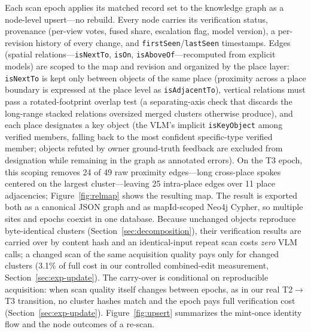 \documentclass[electronics,article,accept,pdftex,moreauthors]{Definitions/mdpi}
\begin{document}
Each scan epoch applies its matched record set to the knowledge graph as a
node-level upsert---no rebuild. Every node carries its verification status,
provenance (per-view votes, fused share, escalation flag, model version), a
per-revision history of every change, and \texttt{firstSeen}/\texttt{lastSeen}
timestamps. Edges (spatial relations---\texttt{isNextTo}, \texttt{isOn},
\texttt{isAboveOf}---recomputed from explicit models) are scoped to the map
and revision and organized by the place layer: \texttt{isNextTo} is kept
only between objects of the same place (proximity across a place boundary
is expressed at the place level as \texttt{isAdjacentTo}), vertical
relations must pass a rotated-footprint overlap test (a separating-axis
check that discards the long-range stacked relations oversized merged
clusters otherwise produce), and each place designates a key object
(the VLM's implicit \texttt{isKeyObject} among verified members, falling
back to the most confident specific-type verified member; objects refuted
by owner ground-truth feedback are excluded from designation while
remaining in the graph as annotated errors). On the T3
epoch, this scoping removes 24 of 49 raw proximity edges---long
cross-place spokes centered on the largest cluster---leaving 25
intra-place edges over 11 place adjacencies; Figure~\ref{fig:relmap} shows
the resulting map. The result is exported both as a canonical
JSON graph and as mapId-scoped Neo4j Cypher, so multiple sites and epochs
coexist in one database. Because unchanged objects reproduce byte-identical
clusters (Section~\ref{sec:decomposition}), their verification results are
carried over by content hash and an identical-input repeat scan costs
\emph{zero} VLM calls;
a changed scan of the same acquisition quality pays only for changed
clusters (3.1\% of full cost in our controlled combined-edit measurement,
Section~\ref{sec:exp-update}). The carry-over is conditional on reproducible
acquisition: when scan quality itself changes between epochs, as in our
real T2$\rightarrow$T3 transition, no cluster hashes match and the epoch
pays full verification cost (Section~\ref{sec:exp-update}).
Figure~\ref{fig:upsert} summarizes
the mint-once identity flow and the node outcomes of a re-scan.
\end{document}
